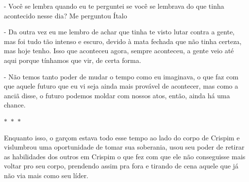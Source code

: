 - Você se lembra quando eu te perguntei se você se lembrava do que tinha acontecido nesse dia? Me perguntou Ítalo

- Da outra vez eu me lembro de achar que tinha te visto lutar contra a gente, mas foi tudo tão intenso e escuro, devido à mata fechada que não tinha certeza, mas hoje tenho. Isso que aconteceu agora, sempre aconteceu, a gente veio até aqui porque tínhamos que vir, de certa forma.

- Não temos tanto poder de mudar o tempo como eu imaginava, o que faz com que aquele futuro que eu vi seja ainda mais provável de acontecer, mas como a anciã disse, o futuro podemos moldar com nossos atos, então, ainda há uma chance.

\begin{center}
  $\ast$~$\ast$~$\ast$
\end{center}
   
Enquanto isso, o garçom estava todo esse tempo ao lado do corpo de Crispim e vislumbrou uma oportunidade de tomar sua soberania, usou seu poder de retirar as habilidades dos outros em Crispim o que fez com que ele não conseguisse mais voltar pro seu corpo, prendendo assim pra fora e tirando de cena aquele que já não via mais como seu líder.



